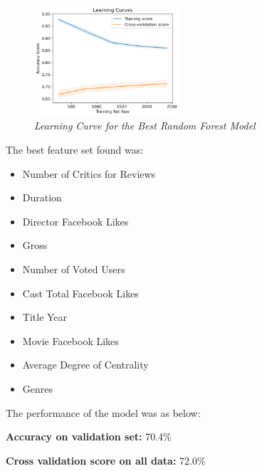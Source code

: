 \begin{figure}[!ht]
    \includegraphics[width = 0.48\textwidth]{res/rf-lc.png}
    \caption{\textit{Learning Curve for the Best Random Forest Model}}
    \label{fig:rf-lc}
\end{figure}
\noindent
The best feature set found was:
\begin{itemize}
    \item Number of Critics for Reviews
    \item Duration
    \item Director Facebook Likes
    \item Gross
    \item Number of Voted Users
    \item Cast Total Facebook Likes
    \item Title Year
    \item Movie Facebook Likes
    \item Average Degree of Centrality
    \item Genres
\end{itemize}

\noindent
The performance of the model was as below:

\noindent
\textbf{Accuracy on validation set:} 70.4\%

\noindent
\textbf{Cross validation score on all data:} 72.0\%  

